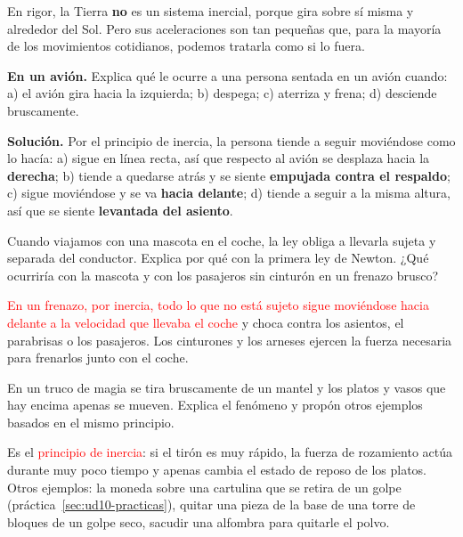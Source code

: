 \begin{remark}
    En rigor, la Tierra \textbf{no} es un sistema inercial, porque gira sobre sí misma y alrededor del Sol. Pero sus aceleraciones
    son tan pequeñas que, para la mayoría de los movimientos cotidianos, podemos tratarla como si lo fuera.
\end{remark}

\begin{example}
    \textbf{En un avión.} Explica qué le ocurre a una persona sentada en un avión cuando: a) el avión gira hacia la izquierda;
    b) despega; c) aterriza y frena; d) desciende bruscamente.

    \textbf{Solución.} Por el principio de inercia, la persona tiende a seguir moviéndose como lo hacía: a) sigue en línea recta,
    así que respecto al avión se desplaza hacia la \textbf{derecha}; b) tiende a quedarse atrás y se siente \textbf{empujada contra el
    respaldo}; c) sigue moviéndose y se va \textbf{hacia delante}; d) tiende a seguir a la misma altura, así que se siente
    \textbf{levantada del asiento}.
\end{example}

\begin{exercise}
    Cuando viajamos con una mascota en el coche, la ley obliga a llevarla sujeta y separada del conductor. Explica por qué con la
    primera ley de Newton. ¿Qué ocurriría con la mascota y con los pasajeros sin cinturón en un frenazo brusco?
    \begin{solu}
        \textcolor{red}{En un frenazo, por inercia, todo lo que no está sujeto sigue moviéndose hacia delante a la velocidad que
        llevaba el coche} y choca contra los asientos, el parabrisas o los pasajeros. Los cinturones y los arneses ejercen la fuerza
        necesaria para frenarlos junto con el coche.
    \end{solu}
\end{exercise}

\begin{exercise}
    En un truco de magia se tira bruscamente de un mantel y los platos y vasos que hay encima apenas se mueven. Explica el fenómeno
    y propón otros ejemplos basados en el mismo principio.
    \begin{solu}
        Es el \textcolor{red}{principio de inercia}: si el tirón es muy rápido, la fuerza de rozamiento actúa durante muy poco tiempo
        y apenas cambia el estado de reposo de los platos. Otros ejemplos: la moneda sobre una cartulina que se retira de un golpe
        (práctica~\ref{sec:ud10-practicas}), quitar una pieza de la base de una torre de bloques de un golpe seco, sacudir una
        alfombra para quitarle el polvo.
    \end{solu}
\end{exercise}


